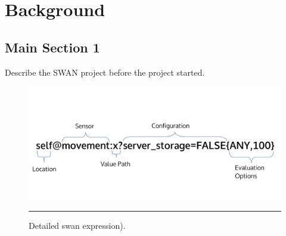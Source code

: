 
\chapter{Background} %

\label{Chapter3} %



\section{Main Section 1}

Describe the SWAN project before the project started.


\begin{figure}[htbp]
  \centering
    \includegraphics[scale=0.6]{Figures/swan_expr.pdf}
    \rule{35em}{0.5pt}
  \caption[Swan Expression]{Detailed swan expression).}
  \label{fig:SwanExpression}
\end{figure}

